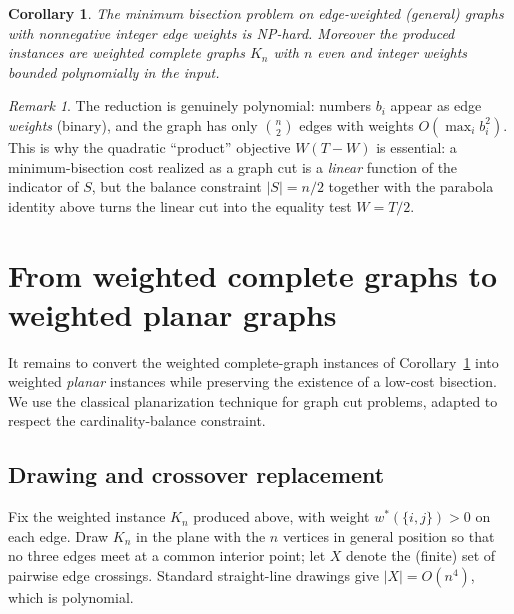 \documentclass{amsart}
\theoremstyle{plain}
\newtheorem{corollary}{Corollary}
\theoremstyle{definition}
\theoremstyle{remark}
\newtheorem{remark}{Remark}
\begin{document}
\begin{corollary}\label{cor:weighted-hard}
The minimum bisection problem on edge-weighted (general) graphs with nonnegative integer
edge weights is NP-hard. Moreover the produced instances are weighted complete graphs
$K_n$ with $n$ even and integer weights bounded polynomially in the input.
\end{corollary}

\begin{remark}
The reduction is genuinely polynomial: numbers $b_i$ appear as edge \emph{weights}
(binary), and the graph has only $\binom{n}{2}$ edges with weights $O(\max_i b_i^2)$.
This is why the quadratic ``product'' objective $W(T-W)$ is essential: a minimum-bisection
cost realized as a graph cut is a \emph{linear} function of the indicator of $S$, but the
balance constraint $|S|=n/2$ together with the parabola identity above turns the linear
cut into the equality test $W=T/2$.
\end{remark}

\section{From weighted complete graphs to weighted planar graphs}\label{sec:planar}

It remains to convert the weighted complete-graph instances of
Corollary~\ref{cor:weighted-hard} into weighted \emph{planar} instances while preserving
the existence of a low-cost bisection. We use the classical planarization technique for
graph cut problems, adapted to respect the cardinality-balance constraint.

\subsection{Drawing and crossover replacement}\label{sec:crossover}

Fix the weighted instance $K_n$ produced above, with weight $w^{\ast}(\{i,j\})>0$ on
each edge. Draw $K_n$ in the plane with the $n$ vertices in general position so that no
three edges meet at a common interior point; let $X$ denote the (finite) set of pairwise
edge crossings. Standard straight-line drawings give $|X|=O(n^4)$, which is polynomial.
\end{document}
